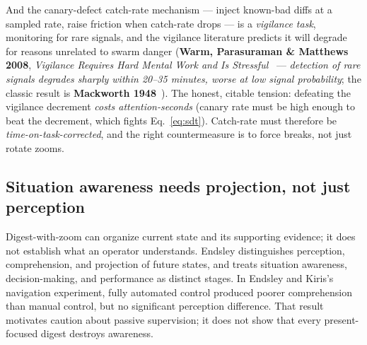 \documentclass[11pt,a4paper]{article}
\theoremstyle{definition}
\theoremstyle{plain}
\begin{document}
And the canary-defect catch-rate mechanism --- inject known-bad diffs at a sampled
rate, raise friction when catch-rate drops --- is a \emph{vigilance task}, monitoring
for rare signals, and the vigilance literature predicts it will degrade for reasons
unrelated to swarm danger (\textbf{Warm, Parasuraman \& Matthews 2008}, \emph{Vigilance
Requires Hard Mental Work and Is Stressful}~ --- \emph{detection of
rare signals degrades sharply within 20--35 minutes, worse at low signal
probability}; the classic result is \textbf{Mackworth 1948}~).
The honest, citable tension: defeating the vigilance decrement \emph{costs
attention-seconds} (canary rate must be high enough to beat the decrement, which
fights Eq.~\ref{eq:sdt}). Catch-rate must therefore be \emph{time-on-task-corrected},
and the right countermeasure is to force breaks, not just rotate zooms.


\pagebreak
\subsection{Situation awareness needs projection, not just perception}\label{sec:sa}

Digest-with-zoom can organize current state and its supporting evidence; it does
not establish what an operator understands. Endsley
distinguishes perception, comprehension, and projection of future states, and
treats situation awareness, decision-making, and performance as distinct stages.
In Endsley and Kiris's navigation experiment,
fully automated control produced poorer comprehension than manual control, but
no significant perception difference. That result motivates caution about passive
supervision; it does not show that every present-focused digest destroys awareness.
\end{document}
